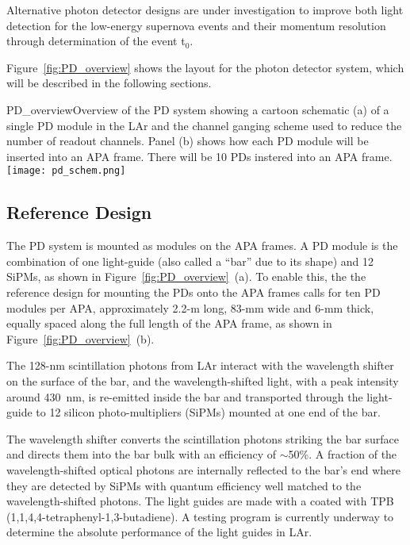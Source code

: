 Alternative photon detector designs are under investigation to improve
both light detection for the low-energy supernova events and their
momentum resolution through determination of the event t$_0$.

Figure~\ref{fig:PD_overview} shows the layout for the photon detector
system, which will be described in the following sections.
\begin{cdrfigure}{PD_overview}{Overview of the PD
    system showing a cartoon schematic (a) of a single PD module
    in the LAr and the channel ganging scheme used to reduce the
    number of readout channels. Panel (b) shows how each PD module
    will be inserted into an APA frame. There will be 10 PDs instered
    into an APA frame.}
\texttt{[image: pd\_schem.png]}
\end{cdrfigure}

\subsection{Reference Design}
\label{sec:detectors-fd-ref-pd-refsystem} 

The PD system is mounted as modules on the APA frames.  A PD module is
the combination of one light-guide (also called a ``bar'' due to its
shape) and 12 SiPMs, as shown in Figure~\ref{fig:PD_overview}~(a).  To
enable this, the the reference design for mounting the PDs onto the
APA frames calls for ten PD modules per APA, approximately 2.2-m long,
83-mm wide and 6-mm thick, equally spaced along the full length of the
APA frame, as shown in Figure~\ref{fig:PD_overview}~(b). 

The 128-nm scintillation photons from LAr interact with the wavelength
shifter on the surface of the bar, and the wavelength-shifted light,
with a peak intensity around 430~nm, is re-emitted inside the bar and
transported through the light-guide to 12 silicon photo-multipliers
(SiPMs) mounted at one end of the bar.

The wavelength shifter converts the scintillation photons striking the
bar surface and directs them into the bar bulk with an efficiency of
$\sim$50\%.  A fraction of the wavelength-shifted optical photons are
internally reflected to the bar's end where they are detected by SiPMs
with quantum efficiency well matched to the wavelength-shifted
photons. The light guides are made with a 
coated with TPB
(1,1,4,4-tetraphenyl-1,3-butadiene). A testing program is currently
underway to determine the absolute performance of the light guides in
LAr.

